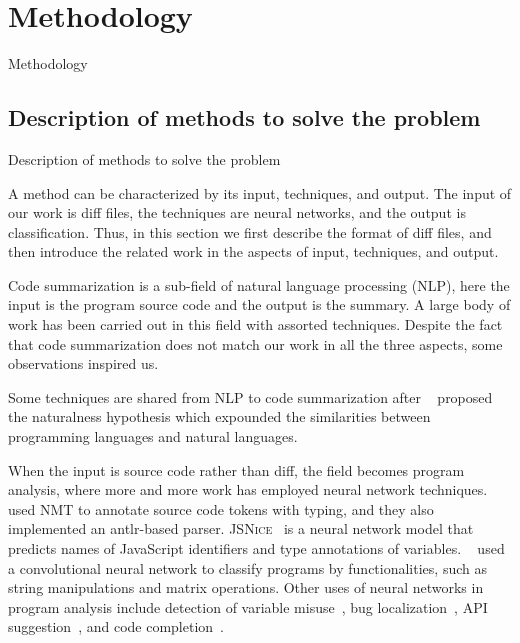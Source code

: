 \chapter{Methodology}

Methodology

\section{Description of methods to solve the problem}

Description of methods to solve the problem








A method can be characterized by its input, techniques, and output.
The input of our work is diff files, the techniques are neural networks, and the output is classification.
Thus, in this section we first describe the format of diff files, and then introduce the related work in the aspects of input, techniques, and output.




Code summarization is a sub-field of natural language processing (NLP),
here the input is the program source code and the output is the summary.
A large body of work has been carried out in this field with assorted techniques.
Despite the fact that code summarization does not match our work in all the three aspects,
some observations inspired us.

Some techniques are shared from NLP to code summarization after ~\cite{allamanis2018survey} proposed the naturalness hypothesis which expounded the similarities between programming languages and natural languages.


When the input is source code rather than diff,
the field becomes program analysis, where more and more work has employed neural network techniques.
~\cite{alexandru2017replicating} used NMT to annotate source code tokens with typing,
and they also implemented an {\sc antlr}-based parser.
\textsc{JSNice}~\cite{raychev2015predicting} is a neural network model that predicts names of JavaScript identifiers and type annotations of variables.
~\cite{mou2016convolutional} used a convolutional neural network to classify programs by functionalities, such as string manipulations and matrix operations.
Other uses of neural networks in program analysis include
detection of variable misuse~\cite{morgachev2019detection},
bug localization~\cite{huo2016learning},
API suggestion~\cite{gu2016deep}, and
code completion~\cite{raychev2014code}.

